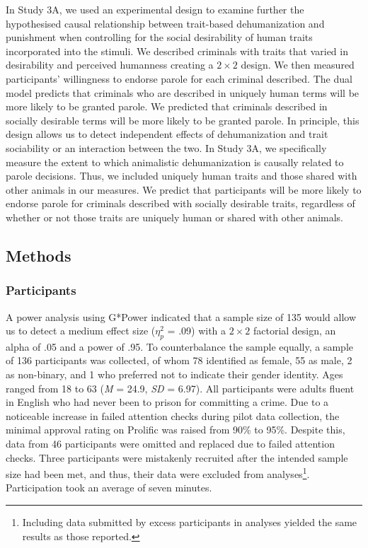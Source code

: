 \documentclass[
]{article}
\begin{document}
In Study 3A, we used an experimental design to examine further the hypothesised causal relationship between trait-based dehumanization and punishment when controlling for the social desirability of human traits incorporated into the stimuli. We described criminals with traits that varied in desirability and perceived humanness creating a \(2 \times 2\) design. We then measured participants' willingness to endorse parole for each criminal described. The dual model predicts that criminals who are described in uniquely human terms will be more likely to be granted parole. We predicted that criminals described in socially desirable terms will be more likely to be granted parole. In principle, this design allows us to detect independent effects of dehumanization and trait sociability or an interaction between the two. In Study 3A, we specifically measure the extent to which animalistic dehumanization is causally related to parole decisions. Thus, we included uniquely human traits and those shared with other animals in our measures. We predict that participants will be more likely to endorse parole for criminals described with socially desirable traits, regardless of whether or not those traits are uniquely human or shared with other animals.

\hypertarget{methods-1}{%
\subsection{Methods}\label{methods-1}}

\hypertarget{participants-4}{%
\subsubsection{Participants}\label{participants-4}}

A power analysis using G*Power indicated that a sample size of 135 would allow us to detect a medium effect size (\(\eta_p^2\) = .09) with a \(2 \times 2\) factorial design, an alpha of .05 and a power of .95. To counterbalance the sample equally, a sample of 136 participants was collected, of whom 78 identified as female, 55 as male, 2 as non-binary, and 1 who preferred not to indicate their gender identity. Ages ranged from 18 to 63 (\emph{M} = 24.9, \emph{SD} = 6.97). All participants were adults fluent in English who had never been to prison for committing a crime. Due to a noticeable increase in failed attention checks during pilot data collection, the minimal approval rating on Prolific was raised from 90\% to 95\%. Despite this, data from 46 participants were omitted and replaced due to failed attention checks. Three participants were mistakenly recruited after the intended sample size had been met, and thus, their data were excluded from analyses\footnote{Including data submitted by excess participants in analyses yielded the same results as those reported.}. Participation took an average of seven minutes.
\end{document}
